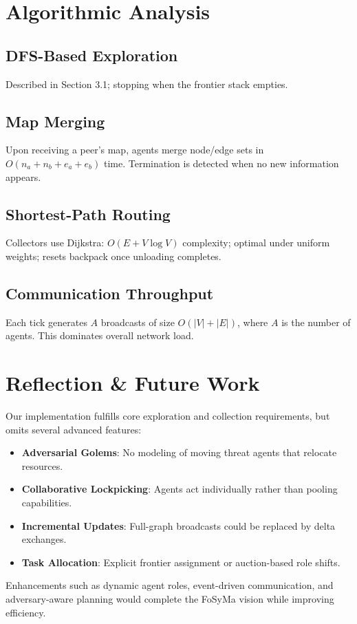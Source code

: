 \documentclass[a4paper, 12pt]{report}
\begin{document}
\section{Algorithmic Analysis}
\subsection{DFS-Based Exploration}
Described in Section 3.1; stopping when the frontier stack empties.

\subsection{Map Merging}
Upon receiving a peer’s map, agents merge node/edge sets in $O(n_a + n_b + e_a + e_b)$ time. Termination is detected when no new information appears.

\subsection{Shortest-Path Routing}
Collectors use Dijkstra: $O(E + V\log V)$ complexity; optimal under uniform weights; resets backpack once unloading completes.

\subsection{Communication Throughput}
Each tick generates $A$ broadcasts of size $O(|V|+|E|)$, where $A$ is the number of agents. This dominates overall network load.

\section{Reflection \& Future Work}
Our implementation fulfills core exploration and collection requirements, but omits several advanced features:
\begin{itemize}
  \item \textbf{Adversarial Golems}: No modeling of moving threat agents that relocate resources.
  \item \textbf{Collaborative Lockpicking}: Agents act individually rather than pooling capabilities.
  \item \textbf{Incremental Updates}: Full-graph broadcasts could be replaced by delta exchanges.
  \item \textbf{Task Allocation}: Explicit frontier assignment or auction-based role shifts.
\end{itemize}

Enhancements such as dynamic agent roles, event-driven communication, and adversary-aware planning would complete the FoSyMa vision while improving efficiency.
\end{document}
